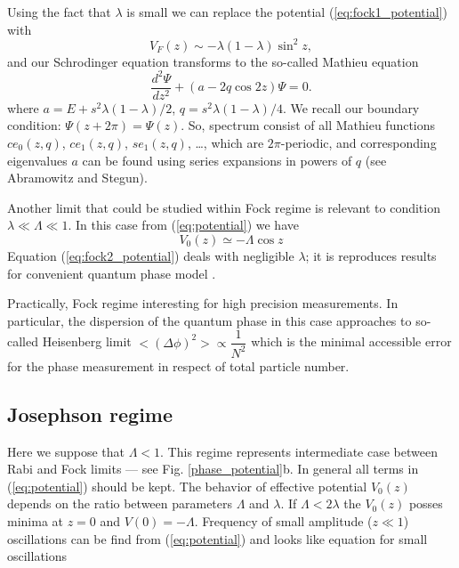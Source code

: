 \documentclass[aps, pre, preprint, groupedaddress, superscriptaddress, showkeys, showpacs] {revtex4-1}
\begin{document}
{\red
Using the fact that $\lambda$ is small we can replace the potential (\ref{eq:fock1_potential}) with
%
\begin{equation}
V_F(z) \sim -\lambda (1 - \lambda) \sin^2{z},
\end{equation}
%
and our Schrodinger equation transforms to the so-called Mathieu equation
%
\begin{equation}
\frac{d^2 \Psi}{d z^2} + (a - 2q  \cos{2z}) \Psi = 0.
\end{equation}
%
where $a = E + s^2 \lambda(1 - \lambda) / 2$, $q = s^2 \lambda (1 - \lambda)/ 4$.
We recall our boundary condition: $\Psi(z + 2\pi) = \Psi(z)$.
So, spectrum consist of all Mathieu functions $ce_0(z, q)$, $ce_1(z, q)$, $se_1(z, q)$, \dots, which are $2\pi$-periodic, and corresponding eigenvalues $a$ can be found using series expansions in powers of $q$ (see Abramowitz and Stegun).
}

Another limit that could be studied within Fock regime is relevant to condition $\lambda \ll \Lambda \ll 1$.
In this case from (\ref{eq:potential}) we have
% 
\begin{equation}
V_0(z) \simeq -\Lambda \cos{z}
\label{eq:fock2_potential}
\end{equation}
%
Equation (\ref{eq:fock2_potential}) deals with negligible $\lambda$; it is reproduces results for convenient quantum phase model \cite{Anglin}.

Practically, Fock regime interesting for high precision measurements.
In particular, the dispersion of the quantum phase in this case approaches to so-called Heisenberg limit {\red $< (\Delta\phi)^2 > \propto \dfrac{1}{N^2}$} which is the minimal accessible error for the phase measurement in respect of total particle number.

\subsection{Josephson regime}

Here we suppose that {\red $\Lambda < 1$}.
This regime represents intermediate case between Rabi and Fock limits --- see Fig. \ref{phase_potential}b.
In general all terms in (\ref{eq:potential}) should be kept.
The behavior of effective potential $V_0(z)$ depends on the ratio between parameters $\Lambda$ and $\lambda$.
If $\Lambda < 2\lambda$ the $V_0(z)$ posses minima at $z = 0$ and $V(0) = -\Lambda$.
Frequency of small amplitude ($z \ll 1$) oscillations can be find from (\ref{eq:potential}) and looks like
{\red equation for small oscillations}
\end{document}
